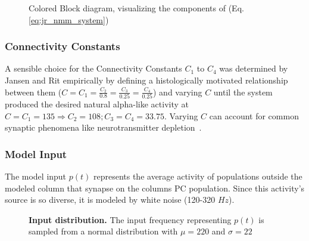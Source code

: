 \begin{figure}[H]
    \centering
    
    \caption{Colored Block diagram, visualizing the components of (Eq. \ref{eq:jr_nmm_system})}
    \label{fig:JRBlockColored}
\end{figure}

\subsubsection{Connectivity Constants}

A sensible choice for the Connectivity Constants $C_1$ to $C_4$ was determined by Jansen and Rit empirically by
defining a histologically motivated relationship between them ($C = C_1 = \frac{C_2}{0.8} = \frac{C_3}{0.25} =
\frac{C_4}{0.25}$) and varying $C$ until the system produced the desired natural alpha-like activity at $C=C_1=135
\Rightarrow C_2=108; C_3=C_4=33.75$.
Varying $C$ can account for common synaptic phenomena like
neurotransmitter depletion~\parencite{jansen_electroencephalogram_1995}.


\subsubsection{Model Input}

The model input $p(t)$ represents the average activity of populations outside the modeled
column that synapse on the columns PC population.
Since this activity's source is so diverse, it is modeled by white noise (120-320 $Hz$).

\begin{figure}[H]
    \centering
    \pgfplotsset{compat = newest}

    \caption{
        \textbf{Input distribution.}
        The input frequency representing $p(t)$ is sampled from a normal distribution with $\mu=220$ and $\sigma=22$}
    \label{fig:ModelInput}
\end{figure}

